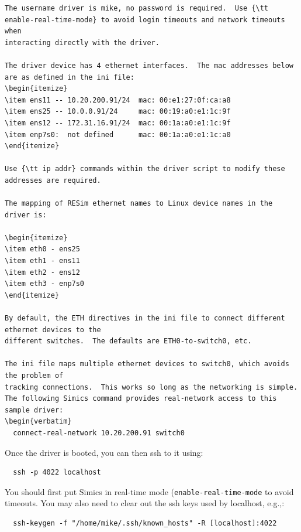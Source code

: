 \documentclass[titlepage]{article}
\begin{document}
\begin{appendices}
\begin {verbatim}
The username driver is mike, no password is required.  Use {\tt enable-real-time-mode} to avoid login timeouts and network timeouts when
interacting directly with the driver.  

The driver device has 4 ethernet interfaces.  The mac addresses below are as defined in the ini file:
\begin{itemize}
\item ens11 -- 10.20.200.91/24  mac: 00:e1:27:0f:ca:a8
\item ens25 -- 10.0.0.91/24     mac: 00:19:a0:e1:1c:9f
\item ens12 -- 172.31.16.91/24  mac: 00:1a:a0:e1:1c:9f
\item enp7s0:  not defined      mac: 00:1a:a0:e1:1c:a0 
\end{itemize}

Use {\tt ip addr} commands within the driver script to modify these addresses are required.

The mapping of RESim ethernet names to Linux device names in the driver is: 

\begin{itemize}
\item eth0 - ens25
\item eth1 - ens11
\item eth2 - ens12
\item eth3 - enp7s0
\end{itemize}

By default, the ETH directives in the ini file to connect different ethernet devices to the
different switches.  The defaults are ETH0-to-switch0, etc.

The ini file maps multiple ethernet devices to switch0, which avoids the problem of
tracking connections.  This works so long as the networking is simple.
The following Simics command provides real-network access to this sample driver:
\begin{verbatim}
  connect-real-network 10.20.200.91 switch0
\end{verbatim}
Once the driver is booted, you can then ssh to it using:
\begin{verbatim}
  ssh -p 4022 localhost
\end{verbatim}
You should first put Simics in real-time mode ({\tt enable-real-time-mode} to avoid timeouts.  You may also need to clear out the
ssh keys used by localhost, e.g.,:
\begin{verbatim}
  ssh-keygen -f "/home/mike/.ssh/known_hosts" -R [localhost]:4022
\end{verbatim}



\end{appendices}
\end{document}
